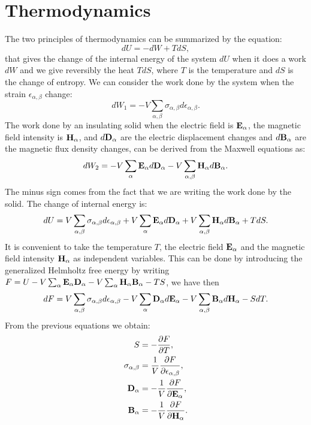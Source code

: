 \documentclass[12pt,a4paper]{article}
\begin{document}
\section{\color{coral}Thermodynamics}
The two principles of thermodynamics can be summarized by the equation:
\begin{equation}
dU = -dW + T dS,
\end{equation}
that gives the change of the internal energy of the system $dU$ when
it does a work $dW$ and we give reversibly the heat $T dS$, where $T$ 
is the temperature and $dS$ is the change of entropy.
We can consider the work done by the system when the strain
$\epsilon_{\alpha,\beta}$ change:
\begin{equation}
dW_1 =-V \sum_{\alpha,\beta} \sigma_{\alpha,\beta} d \epsilon_{\alpha,\beta}. 
\end{equation}
The work done by an insulating solid when the electric field is 
${\bf E}_\alpha$, the magnetic field intensity is ${\bf H}_\alpha$, 
and $d {\bf D}_\alpha$ are the electric displacement changes and 
$d {\bf B}_\alpha$ are the magnetic flux density changes, can be derived
from the Maxwell equations as: 
\begin{equation}
dW_2 = -V \sum_\alpha {\bf E}_\alpha d {\bf D}_\alpha 
-V \sum_{\alpha,\beta} {\bf H}_{\alpha} d {\bf B}_\alpha.
\end{equation}
The minus sign comes from the fact that we are writing the work done by the
solid. The change of internal energy is:
\begin{equation}
dU = V \sum_{\alpha,\beta} \sigma_{\alpha,\beta} d \epsilon_{\alpha,\beta}
+ V \sum_\alpha {\bf E}_\alpha d {\bf D}_\alpha + 
V \sum_{\alpha,\beta} {\bf H}_{\alpha} d {\bf B}_\alpha + T dS.
\end{equation}
It is convenient to take the temperature $T$,
the electric field ${\bf E}_\alpha$ and the magnetic field intensity
${\bf H}_\alpha$ as independent variables.
This can be done by introducing the generalized Helmholtz free energy 
by writing
$F=U- V \sum_{\alpha} {\bf E}_\alpha {\bf D}_\alpha -
V \sum_{\alpha} {\bf H}_\alpha {\bf B}_\alpha - TS $, we have then
\begin{equation}
dF = V \sum_{\alpha,\beta} \sigma_{\alpha,\beta} d \epsilon_{\alpha,\beta}
- V \sum_\alpha {\bf D}_\alpha d {\bf E}_\alpha - 
V \sum_{\alpha,\beta} {\bf B}_{\alpha} d {\bf H}_\alpha - S dT.
\end{equation}
From the previous equations we obtain:
\begin{align}
S&=-{\partial F \over \partial T}, \\
\sigma_{\alpha,\beta}&= {1\over V}
{\partial F \over \partial \epsilon_{\alpha,\beta}}, \\
{\bf D}_{\alpha}&= -{1\over V}
{\partial F \over \partial {\bf E}_{\alpha}}, \\
{\bf B}_{\alpha}&= -{1\over V}
{\partial F \over \partial {\bf H}_{\alpha}}.
\end{align}
\end{document}
